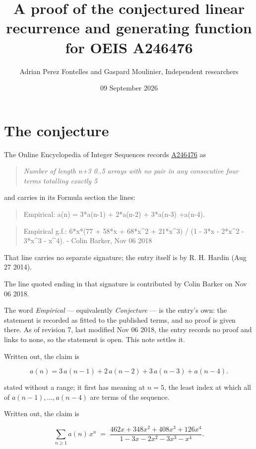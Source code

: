 \documentclass[11pt]{article}
\title{A proof of the conjectured linear recurrence and generating function for OEIS A246476}
\author{Adrian Perez Fontelles and Gaspard Moulinier, Independent researchers}
\date{09 September 2026}
\theoremstyle{definition}
\begin{document}
\maketitle
\section{The conjecture}

The Online Encyclopedia of Integer Sequences records \href{https://oeis.org/A246476}{A246476} as

\begin{quote}\itshape Number of length n+3 0..5 arrays with no pair in any consecutive four terms totalling exactly 5\end{quote}

and carries in its Formula section the lines:

\begin{quote}\ttfamily Empirical: a(n) = 3*a(n-1) + 2*a(n-2) + 3*a(n-3) +a(n-4).\end{quote}

\begin{quote}\ttfamily Empirical g.f.: 6*x*(77 + 58*x + 68*x\textasciicircum{}2 + 21*x\textasciicircum{}3) / (1 - 3*x - 2*x\textasciicircum{}2 - 3*x\textasciicircum{}3 - x\textasciicircum{}4). - Colin Barker, Nov 06 2018\end{quote}

That line carries no separate signature; the entry itself is by R. H. Hardin (Aug 27 2014).

The line quoted ending in that signature is contributed by Colin Barker on Nov 06 2018.

The word {\itshape Empirical} --- equivalently {\itshape Conjecture} --- is the entry's own: the statement is recorded as fitted to the published terms, and no proof is given there. As of revision 7, last modified Nov 06 2018, the entry records no proof and links to none, so the statement is open. This note settles it.

Written out, the claim is

\[a(n) = 3\,a(n-1) + 2\,a(n-2) + 3\,a(n-3) + a(n-4).\]

stated without a range; it first has meaning at $n = 5$, the least index at which all of $a(n-1),\dots,a(n-4)$ are terms of the sequence.

Written out, the claim is

\[\sum_{n \ge 1} a(n)\,x^n \;=\; \frac{462x + 348x^{2} + 408x^{3} + 126x^{4}}{1 - 3x - 2x^{2} - 3x^{3} - x^{4}}.\]
\end{document}
